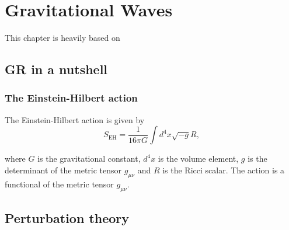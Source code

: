 \chapter{Gravitational Waves}
\label{chap:gravitational_waves}

This chapter is heavily based on \cite{10.1093/acprof:oso/9780198570745.001.0001}

\section{GR in a nutshell}

\subsection{The Einstein-Hilbert action}

The Einstein-Hilbert action is given by
\begin{equation}
    S_{\text{EH}} = \frac{1}{16\pi G} \int d^4 x \sqrt{-g} R,
\end{equation}

where $G$ is the gravitational constant, $d^4 x$ is the volume element, $g$ is the determinant of the metric tensor $g_{\mu\nu}$ and $R$ is the Ricci scalar. The action is a functional of the metric tensor $g_{\mu\nu}$.

\section{Perturbation theory}

